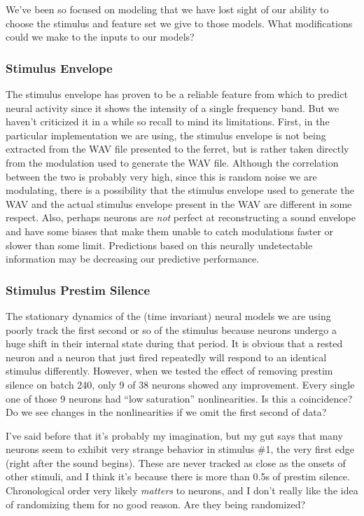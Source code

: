 \documentclass[11pt]{article}
\begin{document}
   We've been so focused on modeling that we have lost sight of our ability to choose the stimulus and feature set we give to those models. What modifications could we make to the inputs to our models?

\subsubsection{Stimulus Envelope}
\label{sec-2.1.1}

    
    The stimulus envelope has proven to be a reliable feature from which to predict neural activity since it shows the intensity of a single frequency band. But we haven't criticized it in a while so recall to mind its limitations. First, in the particular implementation we are using, the stimulus envelope is not being extracted from the WAV file presented to the ferret, but is rather taken directly from the modulation used to generate the WAV file. Although the correlation between the two is probably very high, since this is random noise we are modulating, there is a possibility that the stimulus envelope used to generate the WAV and the actual stimulus envelope present in the WAV are different in some respect. Also, perhaps neurons are \emph{not} perfect at reconstructing a sound envelope and have some biases that make them unable to catch modulations faster or slower than some limit. Predictions based on this neurally undetectable information may be decreasing our predictive performance.

\subsubsection{Stimulus Prestim Silence}
\label{sec-2.1.2}


    The stationary dynamics of the (time invariant) neural models we are using poorly track the first second or so of the stimulus because neurons undergo a huge shift in their internal state during that period. It is obvious that a rested neuron and a neuron that just fired repeatedly will respond to an identical stimulus differently. However, when we tested the effect of removing prestim silence on batch 240, only 9 of 38 neurons showed any improvement. Every single one of those 9 neurons had ``low saturation'' nonlinearities. Is this a coincidence? Do we see changes in the nonlinearities if we omit the first second of data?
    
    I've said before that it's probably my imagination, but my gut says that many neurons seem to exhibit very strange behavior in stimulus \#1, the very first edge (right after the sound begins). These are never tracked as close as the onsets of other stimuli, and I think it's because there is more than 0.5s of prestim silence. Chronological order very likely \emph{matters} to neurons, and I don't really like the idea of randomizing them for no good reason. Are they being randomized? 
\end{document}
